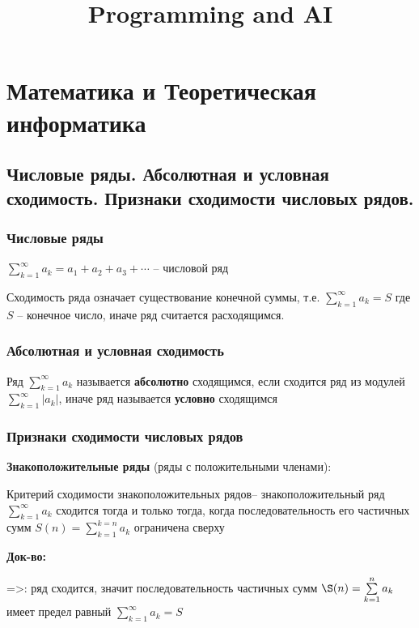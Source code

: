 \documentclass{article}
\title{Programming and AI} %
\begin{document}
	
\maketitle %
\section{Математика и Теоретическая информатика}

\subsection{Числовые ряды. Абсолютная и условная сходимость. Признаки сходимости числовых рядов.}

\subsubsection{Числовые ряды}

$\sum\limits_{k=1}^{\infty} a_{k} = a_{1} + a_{2} + a_{3} + \cdots$ -- числовой ряд

Сходимость ряда означает существование конечной суммы, т.е. $\sum\limits_{k=1}^{\infty} a_{k} = S$ где $S$ -- конечное число, иначе ряд считается расходящимся.

\subsubsection{Абсолютная и условная сходимость}

Ряд $\sum\limits_{k=1}^{\infty} a_{k}$ называется {\bf абсолютно} сходящимся, если сходится ряд из модулей $\sum\limits_{k=1}^{\infty} |a_{k}|$, иначе ряд называется {\bf условно} сходящимся

\subsubsection{Признаки сходимости числовых рядов} 

{\bf Знакоположительные ряды} (ряды с положительными членами):

Критерий сходимости знакоположительных рядов-- знакоположительный ряд $\sum\limits_{k=1}^{\infty} a_{k}$ сходится тогда и только тогда, когда последовательность его частичных сумм $S(n) = \sum\limits_{k=1}^{k=n}a_{k}$ ограничена сверху

{\bf Док-во:}

=>: ряд сходится, значит последовательность частичных сумм $\S(n) =\sum\limits_{k=1}^{n} a_{k}$ имеет предел равный $\sum\limits_{k=1}^{\infty} a_{k} = S$
\end{document}
